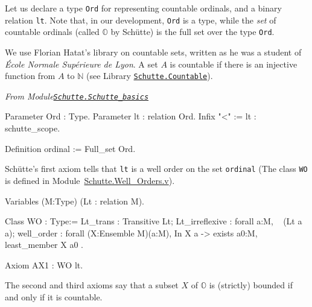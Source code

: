 Let us declare a type 
\texttt{Ord} for representing countable ordinals, and a binary relation
 \texttt{lt}. Note that, in our development, \texttt{Ord} is a type, while the \emph{set} of countable ordinals (called $\mathbb{O}$ by Schütte) 
is the full set over the type \texttt{Ord}.

\label{types:Ord} 

We use Florian Hatat's library on countable sets, written as he was a student of  \emph{\'Ecole Normale Supérieure de Lyon}. A set $A$ is countable if there is an injective function from $A$ to $\mathbb{N}$ (see 
Library \href{../theories/html/hydras.Schutte.Countable.html}%
{\texttt{Schutte.Countable}}).


\vspace{6pt}

\emph{From Module\href{../theories/html/hydras.Schutte.Schutte_basics.html}%
{\texttt{Schutte.Schutte\_basics}}}


\begin{Coqsrc}
Parameter Ord : Type.
Parameter lt : relation Ord.
Infix "<" := lt : schutte_scope.

Definition ordinal := Full_set Ord.
\end{Coqsrc}

Schütte's first axiom tells that \texttt{lt} is a well order on the set 
\texttt{ordinal} (The  class \texttt{WO} is defined in
Module~\href{../theories/html/hydras.Schutte.Well_Orders.html}{Schutte.Well\_Orders.v}).


\label{types:WO}

\begin{Coqsrc}
Variables (M:Type)
         (Lt : relation M).
  
Class WO : Type:=
    {
      Lt_trans : Transitive  Lt;
      Lt_irreflexive : forall a:M, ~ (Lt a a);
      well_order : forall (X:Ensemble M)(a:M),
          In X a ->
          exists a0:M, least_member  X a0
    }.
\end{Coqsrc}



\begin{Coqsrc}
  Axiom AX1 : WO lt.
\end{Coqsrc}

The second and third axioms say that a subset $X$ of $\mathbb{O}$ is
(strictly) bounded if and only if it is countable. 



